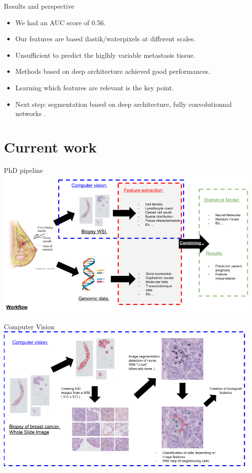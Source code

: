 \documentclass{beamer}
\begin{document}
\begin{frame}{Results and perspective}
\begin{itemize}
\item We had an AUC score of 0.56.
\item Our features are based ilastik/waterpixels at different scales.
\item Unsufficient to predict the higlhly variable metastasis tissue.
\item Methods based on deep architecture achieved good performances.
\item Learning which features are relevant is the key point.
\item Next step: segmentation based on deep architecture, fully convolutionnal networks .
\end{itemize}
\end{frame}


\section{Current work}

\begin{frame}{PhD pipeline}
\includegraphics[width=\textwidth]{Workflow_overview.png}
\end{frame}
\begin{frame}{Computer Vision}
\includegraphics[width=\textwidth]{ComputerVision.png}
\end{frame}
\end{document}
